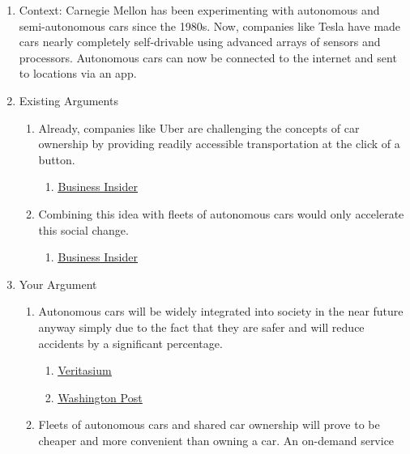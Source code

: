 \documentclass{article}
\begin{document}
\begin{enumerate}
\begin{enumerate}
    \item Context: Carnegie Mellon has been experimenting with autonomous and
      semi-autonomous cars since the 1980s. Now, companies like Tesla have made
      cars nearly completely self-drivable using advanced arrays of sensors and
      processors. Autonomous cars can now be connected to the internet and sent
      to locations via an app.
    \item Existing Arguments
    \begin{enumerate}
      \item Already, companies like Uber are challenging the concepts of car
        ownership by providing readily accessible transportation at the click
        of a button.
      \begin{enumerate}
        \item \href{http://www.businessinsider.com/ubers-plans-to-be-cheaper-than-owning-a-car-2015-2}{\underline{Business Insider}}
      \end{enumerate}
      \item Combining this idea with fleets of autonomous cars would only
        accelerate this social change.
      \begin{enumerate}
        \item \href{http://www.businessinsider.com/former-tesla-vp-georg-bauer-autonomy-will-kill-car-ownership-2016-11}{\underline{Business Insider}}
      \end{enumerate}
    \end{enumerate}
    \item Your Argument
    \begin{enumerate}
      \item Autonomous cars will be widely integrated into society in the near
        future anyway simply due to the fact that they are safer and will reduce
        accidents by a significant percentage.
      \begin{enumerate}
        \item \href{https://www.youtube.com/watch?v=WBjY3QGNdAw}{\underline{Veritasium}}
        \item \href{https://www.washingtonpost.com/news/innovations/wp/2017/02/20/the-big-moral-dilemma-facing-self-driving-cars/?utm_term=.802ae11b67c4}{\underline{Washington Post}}
      \end{enumerate}
      \item Fleets of autonomous cars and shared car ownership will prove to be
        cheaper and more convenient than owning a car. An on-demand service

\end{enumerate}
\end{enumerate}
\end{enumerate}
\end{document}
